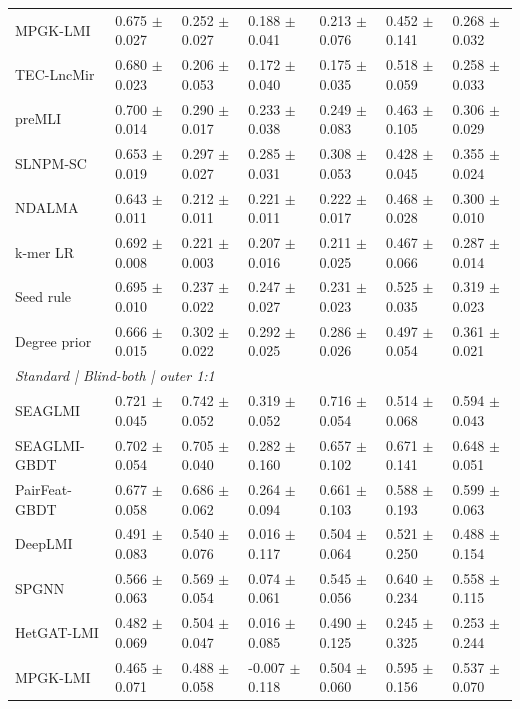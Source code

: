 \begin{landscape}
{\begin{longtable}{lllllll}
MPGK-LMI & 0.675 $\pm$ 0.027 & 0.252 $\pm$ 0.027 & 0.188 $\pm$ 0.041 & 0.213 $\pm$ 0.076 & 0.452 $\pm$ 0.141 & 0.268 $\pm$ 0.032 \\
TEC-LncMir & 0.680 $\pm$ 0.023 & 0.206 $\pm$ 0.053 & 0.172 $\pm$ 0.040 & 0.175 $\pm$ 0.035 & 0.518 $\pm$ 0.059 & 0.258 $\pm$ 0.033 \\
preMLI & 0.700 $\pm$ 0.014 & 0.290 $\pm$ 0.017 & 0.233 $\pm$ 0.038 & 0.249 $\pm$ 0.083 & 0.463 $\pm$ 0.105 & 0.306 $\pm$ 0.029 \\
SLNPM-SC & 0.653 $\pm$ 0.019 & 0.297 $\pm$ 0.027 & 0.285 $\pm$ 0.031 & 0.308 $\pm$ 0.053 & 0.428 $\pm$ 0.045 & 0.355 $\pm$ 0.024 \\
NDALMA & 0.643 $\pm$ 0.011 & 0.212 $\pm$ 0.011 & 0.221 $\pm$ 0.011 & 0.222 $\pm$ 0.017 & 0.468 $\pm$ 0.028 & 0.300 $\pm$ 0.010 \\
k-mer LR & 0.692 $\pm$ 0.008 & 0.221 $\pm$ 0.003 & 0.207 $\pm$ 0.016 & 0.211 $\pm$ 0.025 & 0.467 $\pm$ 0.066 & 0.287 $\pm$ 0.014 \\
Seed rule & 0.695 $\pm$ 0.010 & 0.237 $\pm$ 0.022 & 0.247 $\pm$ 0.027 & 0.231 $\pm$ 0.023 & 0.525 $\pm$ 0.035 & 0.319 $\pm$ 0.023 \\
Degree prior & 0.666 $\pm$ 0.015 & 0.302 $\pm$ 0.022 & 0.292 $\pm$ 0.025 & 0.286 $\pm$ 0.026 & 0.497 $\pm$ 0.054 & 0.361 $\pm$ 0.021 \\
\multicolumn{7}{l}{\textit{Standard | Blind-both | outer 1:1}}\\
SEAGLMI & 0.721 $\pm$ 0.045 & 0.742 $\pm$ 0.052 & 0.319 $\pm$ 0.052 & 0.716 $\pm$ 0.054 & 0.514 $\pm$ 0.068 & 0.594 $\pm$ 0.043 \\
SEAGLMI-GBDT & 0.702 $\pm$ 0.054 & 0.705 $\pm$ 0.040 & 0.282 $\pm$ 0.160 & 0.657 $\pm$ 0.102 & 0.671 $\pm$ 0.141 & 0.648 $\pm$ 0.051 \\
PairFeat-GBDT & 0.677 $\pm$ 0.058 & 0.686 $\pm$ 0.062 & 0.264 $\pm$ 0.094 & 0.661 $\pm$ 0.103 & 0.588 $\pm$ 0.193 & 0.599 $\pm$ 0.063 \\
DeepLMI & 0.491 $\pm$ 0.083 & 0.540 $\pm$ 0.076 & 0.016 $\pm$ 0.117 & 0.504 $\pm$ 0.064 & 0.521 $\pm$ 0.250 & 0.488 $\pm$ 0.154 \\
SPGNN & 0.566 $\pm$ 0.063 & 0.569 $\pm$ 0.054 & 0.074 $\pm$ 0.061 & 0.545 $\pm$ 0.056 & 0.640 $\pm$ 0.234 & 0.558 $\pm$ 0.115 \\
HetGAT-LMI & 0.482 $\pm$ 0.069 & 0.504 $\pm$ 0.047 & 0.016 $\pm$ 0.085 & 0.490 $\pm$ 0.125 & 0.245 $\pm$ 0.325 & 0.253 $\pm$ 0.244 \\
MPGK-LMI & 0.465 $\pm$ 0.071 & 0.488 $\pm$ 0.058 & -0.007 $\pm$ 0.118 & 0.504 $\pm$ 0.060 & 0.595 $\pm$ 0.156 & 0.537 $\pm$ 0.070 \\

\end{longtable}}
\end{landscape}
